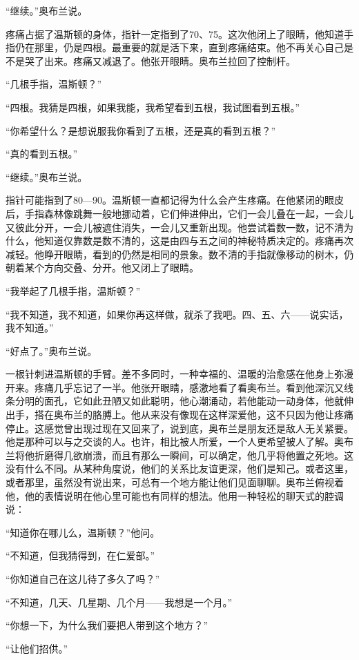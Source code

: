 ``继续。''奥布兰说。

疼痛占据了温斯顿的身体，指针一定指到了70、75。这次他闭上了眼睛，他知道手指仍在那里，仍是四根。最重要的就是活下来，直到疼痛结束。他不再关心自己是不是哭了出来。疼痛又减退了。他张开眼睛。奥布兰拉回了控制杆。

``几根手指，温斯顿？''

``四根。我猜是四根，如果我能，我希望看到五根，我试图看到五根。''

``你希望什么？是想说服我你看到了五根，还是真的看到五根？''

``真的看到五根。''

``继续。''奥布兰说。

指针可能指到了80---90。温斯顿一直都记得为什么会产生疼痛。在他紧闭的眼皮后，手指森林像跳舞一般地挪动着，它们伸进伸出，它们一会儿叠在一起，一会儿又彼此分开，一会儿被遮住消失，一会儿又重新出现。他尝试着数一数，记不清为什么，他知道仅靠数是数不清的，这是由四与五之间的神秘特质决定的。疼痛再次减轻。他睁开眼睛，看到的仍然是相同的景象。数不清的手指就像移动的树木，仍朝着某个方向交叠、分开。他又闭上了眼睛。

``我举起了几根手指，温斯顿？''

``我不知道，我不知道，如果你再这样做，就杀了我吧。四、五、六——说实话，我不知道。''

``好点了。''奥布兰说。

一根针刺进温斯顿的手臂。差不多同时，一种幸福的、温暖的治愈感在他身上弥漫开来。疼痛几乎忘记了一半。他张开眼睛，感激地看了看奥布兰。看到他深沉又线条分明的面孔，它如此丑陋又如此聪明，他心潮涌动，若他能动一动身体，他就伸出手，搭在奥布兰的胳膊上。他从来没有像现在这样深爱他，这不只因为他让疼痛停止。这感觉曾出现过现在又回来了，说到底，奥布兰是朋友还是敌人无关紧要。他是那种可以与之交谈的人。也许，相比被人所爱，一个人更希望被人了解。奥布兰将他折磨得几欲崩溃，而且有那么一瞬间，可以确定，他几乎将他置之死地。这没有什么不同。从某种角度说，他们的关系比友谊更深，他们是知己。或者这里，或者那里，虽然没有说出来，可总有一个地方能让他们见面聊聊。奥布兰俯视着他，他的表情说明在他心里可能也有同样的想法。他用一种轻松的聊天式的腔调说：

``知道你在哪儿么，温斯顿？''他问。

``不知道，但我猜得到，在仁爱部。''

``你知道自己在这儿待了多久了吗？''

``不知道，几天、几星期、几个月——我想是一个月。''

``你想一下，为什么我们要把人带到这个地方？''

``让他们招供。''

